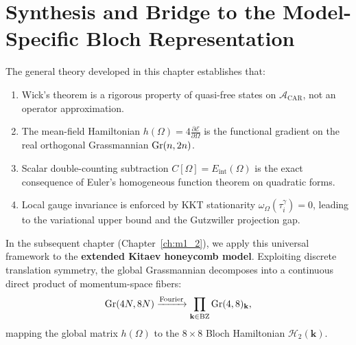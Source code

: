 \section{Synthesis and Bridge to the Model-Specific Bloch Representation}
\label{sec:m1_1b_bridge_to_model}
The general theory developed in this chapter establishes that:
\begin{enumerate}
    \item Wick's theorem is a rigorous property of quasi-free states on $\mathcal{A}_{\mathrm{CAR}}$, not an operator approximation.
    \item The mean-field Hamiltonian $h(\Omega) = 4 \frac{\partial \mathcal{E}}{\partial \Omega}$ is the functional gradient on the real orthogonal Grassmannian $\operatorname{Gr}(n, 2n)$.
    \item Scalar double-counting subtraction $C[\Omega] = E_{\mathrm{int}}(\Omega)$ is the exact consequence of Euler's homogeneous function theorem on quadratic forms.
    \item Local gauge invariance is enforced by KKT stationarity $\omega_\Omega(\tau_i^\gamma) = 0$, leading to the variational upper bound and the Gutzwiller projection gap.
\end{enumerate}

In the subsequent chapter (Chapter~\ref{ch:m1_2}), we apply this universal framework to the \textbf{extended Kitaev honeycomb model}. Exploiting discrete translation symmetry, the global Grassmannian decomposes into a continuous direct product of momentum-space fibers:
\begin{equation}
\label{eq:m1_1b_grassmannian_fiber_bundle}
\operatorname{Gr}(4N, 8N) \xrightarrow{\text{Fourier}} \prod_{\mathbf{k} \in \mathrm{BZ}} \operatorname{Gr}(4, 8)_{\mathbf{k}},
\end{equation}
mapping the global matrix $h(\Omega)$ to the $8 \times 8$ Bloch Hamiltonian $\mathcal{H}_2(\mathbf{k})$.
